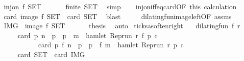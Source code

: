 \begin{isabellebody}
\ {\isacartoucheopen}inj{\isacharunderscore}on\ f\ {\isacharquery}SET{\isacartoucheclose}\ \isacommand{{\isachardot}}\isamarkupfalse%
\isanewline
\ \ \isamarkupfalse%
\ \isamarkupfalse%
\ {\isacartoucheopen}finite\ {\isacharquery}SET{\isacartoucheclose}\ \isamarkupfalse%
\ simp\isanewline
\ \ \isamarkupfalse%
\ inj{\isacharunderscore}on{\isacharunderscore}iff{\isacharunderscore}eq{\isacharunderscore}card{\isacharbrackleft}OF\ this{\isacharbrackright}\ calculation\ \isamarkupfalse%
\ {\isacartoucheopen}card\ {\isacharparenleft}image\ f\ {\isacharquery}SET{\isacharparenright}\ {\isacharequal}\ card\ {\isacharquery}SET{\isacartoucheclose}\ \isamarkupfalse%
\ blast\isanewline
\ \ \isamarkupfalse%
\ \isamarkupfalse%
\ dilating{\isacharunderscore}fun{\isacharunderscore}image{\isacharunderscore}left{\isacharbrackleft}OF\ assms{\isacharbrackright}\ \isamarkupfalse%
\ {\isacartoucheopen}{\isacharquery}IMG\ {\isacharequal}\ image\ f\ {\isacharquery}SET{\isacartoucheclose}\ \isacommand{{\isachardot}}\isamarkupfalse%
\isanewline
\ \ \isamarkupfalse%
\ \isamarkupfalse%
\ {\isacharquery}thesis\ \isamarkupfalse%
\ auto\isanewline
{}\isamarkupfalse%
%
\endisatagproof
{\isafoldproof}%
%
\isadelimproof
\isanewline
%
\endisadelimproof
\isanewline
{}\isamarkupfalse%
\ ticks{\isacharunderscore}as{\isacharunderscore}often{\isacharunderscore}right{\isacharcolon}\isanewline
\ \ \ {\isacartoucheopen}dilating{\isacharunderscore}fun\ f\ r{\isacartoucheclose}\isanewline
\ \ \ \ \ {\isacartoucheopen}card\ {\isacharbraceleft}p{\isachardot}\ n\ {\isacharless}\ p\ {\isasymand}\ p\ {\isasymle}\ m\ {\isasymand}\ hamlet\ {\isacharparenleft}{\isacharparenleft}Rep{\isacharunderscore}run\ r{\isacharparenright}\ {\isacharparenleft}f\ p{\isacharparenright}\ c{\isacharparenright}{\isacharbraceright}\isanewline
\ \ \ \ \ \ \ \ \ \ {\isacharequal}\ card\ {\isacharbraceleft}p{\isachardot}\ f\ n\ {\isacharless}\ p\ {\isasymand}\ p\ {\isasymle}\ f\ m\ {\isasymand}\ hamlet\ {\isacharparenleft}{\isacharparenleft}Rep{\isacharunderscore}run\ r{\isacharparenright}\ p\ c{\isacharparenright}{\isacharbraceright}{\isacartoucheclose}\isanewline
\ \ \ \ {\isacharparenleft}\ {\isacartoucheopen}card\ {\isacharquery}SET\ {\isacharequal}\ card\ {\isacharquery}IMG{\isacartoucheclose}{\isacharparenright}\isanewline
%
\isadelimproof

\end{isabellebody}
